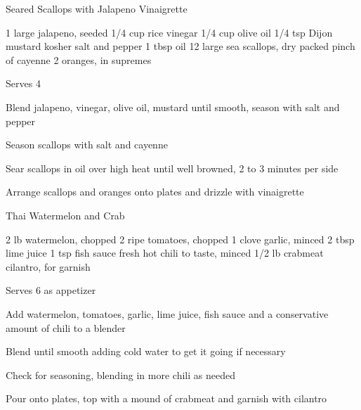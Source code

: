 \begin{recipe}{Seared Scallops with Jalapeno Vinaigrette}{}
\begin{ingredients}
1 large jalapeno, seeded
1/4 cup rice vinegar
1/4 cup olive oil
1/4 tsp Dijon mustard
kosher salt and pepper
1 tbsp oil
12 large sea scallops, dry packed
pinch of cayenne
2 oranges, in supremes
\end{ingredients}
\nextcolumn
Serves 4
\begin{steps}
\item Blend jalapeno, vinegar, olive oil, mustard until smooth, season with salt and pepper
\item Season scallops with salt and cayenne
\item Sear scallops in oil over high heat until well browned, 2 to 3 minutes per side
\item Arrange scallops and oranges onto plates and drizzle with vinaigrette
\end{steps}
\end{recipe}

\begin{recipe}{Thai Watermelon and Crab}{}
\begin{ingredients}
2 lb watermelon, \hphantom{ } chopped
2 ripe tomatoes, \hphantom{ } chopped
1 clove garlic, minced
2 tbsp lime juice
1 tsp fish sauce
fresh hot chili to taste, minced
1/2 lb crabmeat
cilantro, for garnish
\end{ingredients}
\nextcolumn
Serves 6 as appetizer
\begin{steps}
    \item Add watermelon, tomatoes, garlic, lime juice, fish sauce and a conservative amount of chili to a blender
    \item Blend until smooth adding cold water to get it going if necessary
    \item Check for seasoning, blending in more chili as needed
    \item Pour onto plates, top with a mound of crabmeat and garnish with cilantro
\end{steps}
\end{recipe}

